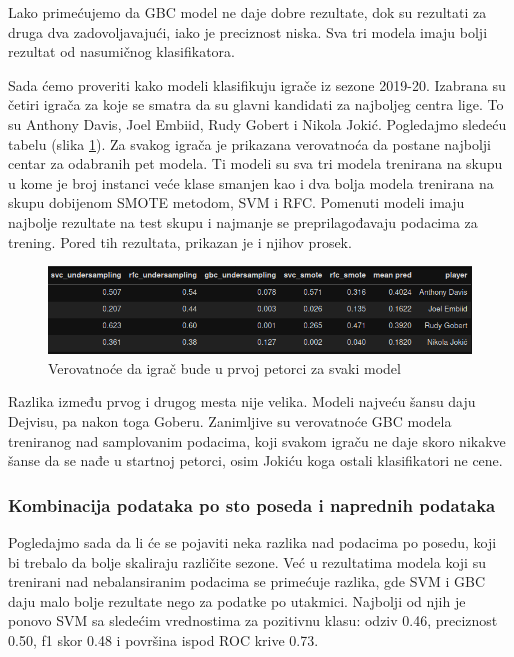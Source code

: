 \documentclass[a4paper]{article}
\begin{document}
Lako primećujemo da GBC model ne daje dobre rezultate, dok su rezultati
za druga dva zadovoljavajući, iako je preciznost niska. Sva tri modela imaju
bolji rezultat od nasumičnog klasifikatora.

Sada ćemo proveriti kako modeli klasifikuju igrače iz sezone 2019-20. Izabrana su četiri igrača za koje se smatra da su glavni kandidati za najboljeg centra lige. To su Anthony Davis, Joel Embiid, Rudy Gobert i Nikola Jokić. Pogledajmo sledeću tabelu (slika \ref{plt:clf_pg}). Za svakog igrača je prikazana verovatnoća da postane najbolji centar za odabranih pet modela. Ti modeli su sva tri modela trenirana na skupu u kome je broj instanci veće klase smanjen kao i dva bolja modela trenirana na skupu dobijenom SMOTE metodom, SVM i RFC. Pomenuti modeli imaju najbolje rezultate na test skupu i najmanje se preprilagođavaju podacima za trening. Pored tih rezultata, prikazan je i njihov prosek.

\begin{figure}[h!]
\begin{center}
\includegraphics[scale=0.50]{clf_pg.png}
\end{center}
\caption{Verovatnoće da igrač bude u prvoj petorci za svaki model}
\label{plt:clf_pg}
\end{figure}

Razlika između prvog i drugog mesta nije velika. Modeli najveću šansu daju
Dejvisu, pa nakon toga Goberu. Zanimljive su verovatnoće GBC modela treniranog nad samplovanim podacima, koji svakom igraču ne daje skoro nikakve šanse da se nađe u startnoj petorci, osim Jokiću koga ostali klasifikatori ne cene.

\subsubsection{Kombinacija podataka po sto poseda i naprednih podataka}
\label{subsubsec:kombo_pp_adv}

Pogledajmo sada da li će se pojaviti neka razlika nad podacima po posedu,
koji bi trebalo da bolje skaliraju različite sezone. Već u rezultatima modela
koji su trenirani nad nebalansiranim podacima se primećuje razlika, gde SVM i
GBC daju malo bolje rezultate nego za podatke po utakmici. Najbolji od njih je
ponovo SVM sa sledećim vrednostima za pozitivnu klasu: odziv 0.46, preciznost
0.50, f1 skor 0.48 i površina ispod ROC krive 0.73.
\end{document}
